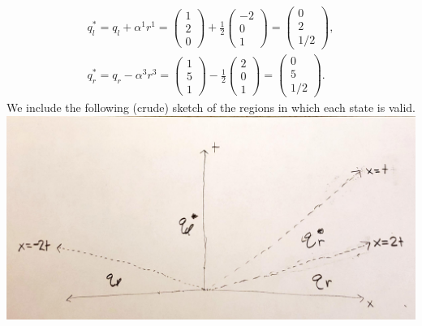 \documentclass{article}
\begin{document}
\begin{align*}
q_{l}^*=q_l+\alpha^1r^1=\begin{pmatrix}
	1\\2\\0
\end{pmatrix}+\frac{1}{2}\begin{pmatrix}
-2\\0\\1
\end{pmatrix}=\begin{pmatrix}
0\\2\\1/2
\end{pmatrix},\\
q_{r}^*=q_r-\alpha^3r^3=\begin{pmatrix}
	1\\5\\1
\end{pmatrix}-\frac{1}{2}\begin{pmatrix}
2\\0\\1
\end{pmatrix}=\begin{pmatrix}
0\\5\\1/2
\end{pmatrix}.
\end{align*}
We include the following (crude) sketch of the regions in which each state is valid.
\includegraphics[scale=0.5]{574hw1figs-1.pdf}
\end{document}
